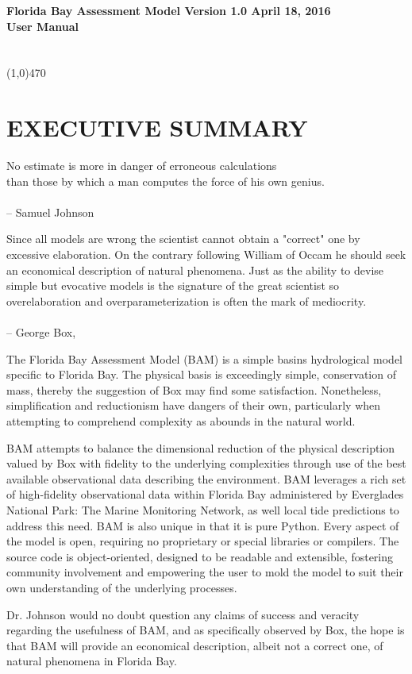 \sffamily
\Large
\noindent\textbf{Florida Bay Assessment Model Version 1.0 April 18, 2016}
\\[0.1in]
\noindent\textbf{User Manual}
\\[0.1in]
\normalsize
{}
\\[0.05in]
\\[0.1in]
\noindent\line(1,0){470}

\section*{EXECUTIVE SUMMARY}
\rmfamily
\large

No estimate is more in danger of erroneous calculations\\
than those by which a man computes the force of his own genius.\\
\\-- Samuel Johnson

Since all models are wrong the scientist cannot obtain a "correct" one by excessive elaboration. On the contrary following William of Occam he should seek an economical description of natural phenomena. Just as the ability to devise simple but evocative models is the signature of the great scientist so overelaboration and overparameterization is often the mark of mediocrity.\\
\\-- George Box, \citep{Box1976}

The Florida Bay Assessment Model (BAM) is a simple basins hydrological model specific to Florida Bay.  The physical basis is exceedingly simple, conservation of mass, thereby the suggestion of Box may find some satisfaction.  Nonetheless, simplification and reductionism have dangers of their own, particularly when attempting to comprehend complexity as abounds in the natural world.

BAM attempts to balance the dimensional reduction of the physical description valued by Box with fidelity to the underlying complexities through use of the best available observational data describing the environment.  BAM leverages a rich set of high-fidelity observational data within Florida Bay administered by Everglades National Park: The Marine Monitoring Network, as well local tide predictions to address this need.  BAM is also unique in that it is pure Python.  Every aspect of the model is open, requiring no proprietary or special libraries or compilers.  The source code is object-oriented, designed to be readable and extensible, fostering community involvement and empowering the user to mold the model to suit their own understanding of the underlying processes. 

Dr. Johnson would no doubt question any claims of success and veracity regarding the usefulness of BAM, and as specifically observed by Box, the hope is that BAM will provide an economical description, albeit not a correct one, of natural phenomena in Florida Bay.

\cleardoublepage


